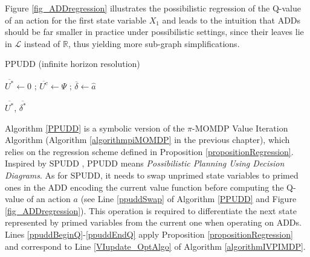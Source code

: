 Figure \ref{fig_ADDregression} illustrates the possibilistic regression of the
Q-value of an action for the first state variable $X_1$ and leads to the intuition that ADDs should be far 
smaller in practice under possibilistic settings, since their leaves lie in $\mathcal{L}$ instead
of $\mathbb{R}$, thus yielding more sub-graph simplifications.


\begin{algorithm} \caption{PPUDD (infinite horizon resolution)} \label{PPUDD} 
 $\overline{U^*} \gets 0$ ;
 $\overline{U^c} \gets \Psi$ ;
 $\overline{\delta} \gets \widehat{a}$ \;

\Return $\overline{U^*}$, $\overline{\delta^*}$ \;
\end{algorithm}

Algorithm \ref{PPUDD} is a symbolic version of the $\pi$-MOMDP Value Iteration Algorithm (Algorithm \ref{algorithmpiMOMDP} in the previous chapter),
which relies on the regression scheme defined in Proposition
\ref{propositionRegression}. Inspired by SPUDD \cite{Hoey99spudd:stochastic},
PPUDD means \emph{Possibilistic Planning Using Decision Diagrams}. As for SPUDD,
it needs to swap unprimed state variables to primed ones in the ADD encoding the
current value function before computing the Q-value of an action $a$ (see Line
\ref{ppuddSwap} of Algorithm \ref{PPUDD} and Figure \ref{fig_ADDregression}). This operation is required to
differentiate the next state represented by primed variables from the
current one when operating on ADDs. Lines \ref{ppuddBeginQ}-\ref{ppuddEndQ} apply
Proposition \ref{propositionRegression} and correspond to Line
\ref{VIupdate_OptAlgo} of Algorithm \ref{algorithmIVPIMDP}.

